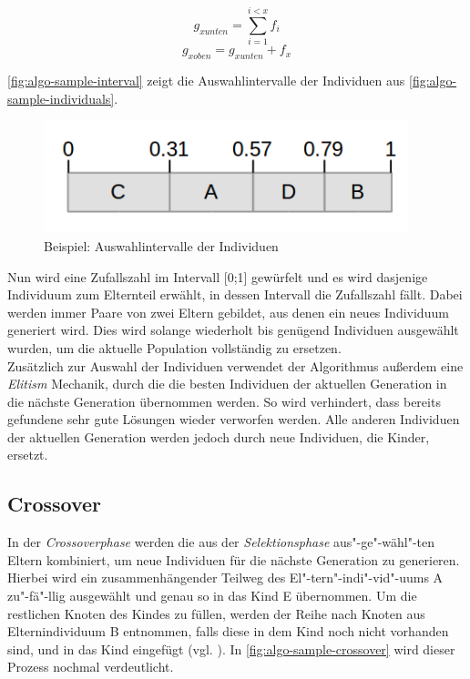 \documentclass[12pt,a4paper]{scrreprt}
\newcommand{\absatz}{\\[12pt]}
\begin{document}
$$
g_{x unten} = \sum_{i=1}^{i<x} f_i
$$
$$
g_{x oben} = g_{x unten} + f_x
$$

\autoref{fig:algo-sample-interval} zeigt die Auswahlintervalle der Individuen aus \autoref{fig:algo-sample-individuals}.

\begin{figure}[ht]
  	\centering
	\includegraphics[width=300pt]{images/algo_03_interval.png}
	\caption{Beispiel: Auswahlintervalle der Individuen}
	\label{fig:algo-sample-interval}
\end{figure}

Nun wird eine Zufallszahl im Intervall [0;1] gewürfelt und es wird dasjenige Individuum zum Elternteil erwählt, in dessen Intervall die Zufallszahl fällt. Dabei werden immer Paare von zwei Eltern gebildet, aus denen ein neues Individuum generiert wird. Dies wird solange wiederholt bis genügend Individuen ausgewählt wurden, um die aktuelle Population vollständig zu ersetzen.\absatz
Zusätzlich zur Auswahl der Individuen verwendet der Algorithmus außerdem eine \textit{Elitism} Mechanik, durch die die besten Individuen der aktuellen Generation in die nächste Generation übernommen werden. So wird verhindert, dass bereits gefundene sehr gute Lösungen wieder verworfen werden. Alle anderen Individuen der aktuellen Generation werden jedoch durch neue Individuen, die Kinder, ersetzt.

\subsection{Crossover}
\label{subsec:crossover}

In der \textit{Crossoverphase} werden die aus der \textit{Selektionsphase} aus"-ge"-wähl"-ten Eltern kombiniert, um neue Individuen für die nächste Generation zu generieren.\\
Hierbei wird ein zusammenhängender Teilweg des El"-tern"-indi"-vid"-uums A zu"-fä"-llig ausgewählt und genau so in das Kind E übernommen. Um die restlichen Knoten des Kindes zu füllen, werden der Reihe nach Knoten aus Elternindividuum B entnommen, falls diese in dem Kind noch nicht vorhanden sind, und in das Kind eingefügt (vgl. \cite{jacobsen12B}). In \autoref{fig:algo-sample-crossover} wird dieser Prozess nochmal verdeutlicht.
\end{document}
